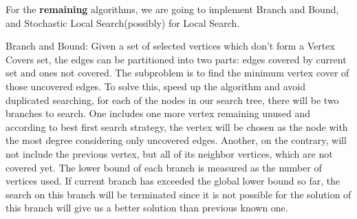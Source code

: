 \documentclass[12pt]{article}
\newcommand{\Z}{\mathbb{Z}}
\newenvironment{proposition}[2][Proposition]{\begin{trivlist}
\item[\hskip \labelsep {\bfseries #1}\hskip \labelsep {\bfseries #2.}]}{\end{trivlist}}
\begin{document}
% 
% 
% 
 
\vspace{-10ex}

For the \textbf{remaining} algorithms, we are going to implement Branch and Bound, and Stochastic Local Search(possibly) for Local Search. 

Branch and Bound: Given a set of selected vertices which don't form a Vertex Covers set, the edges can be partitioned into two parts: edges covered by current set and ones not covered. The subproblem is to find the minimum vertex cover of those uncovered edges. To solve this, speed up the algorithm and avoid duplicated searching, for each of the nodes in our search tree, there will be two branches to search.  One includes one more vertex remaining unused and according to best first search strategy, the vertex will be chosen as the node with the most degree considering only uncovered edges. Another, on the contrary, will not include the previous vertex, but all of its neighbor vertices, which are not covered yet. The lower bound of each branch is measured as the number of vertices used. If current branch has exceeded the global lower bound so far, the search on this branch will be terminated since it is not possible for the solution of this branch will give us a better solution than previous known one. 
\end{document}
